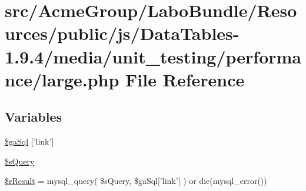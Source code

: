 \hypertarget{large_8php}{\section{src/\+Acme\+Group/\+Labo\+Bundle/\+Resources/public/js/\+Data\+Tables-\/1.9.4/media/unit\+\_\+testing/performance/large.php File Reference}
\label{large_8php}
}
\subsection*{Variables}
\begin{DoxyCompactItemize}
\item 
\hyperlink{large_8php_a57b1f46c51a5dafdbde39b16259c7e77}{\$ga\+Sql} \mbox{[}'link'\mbox{]}
\item 
\hyperlink{large_8php_a5175d5486118502db3f7aa1ccf7029cc}{\$s\+Query}
\item 
\hyperlink{large_8php_a8f423fcb1764890d70da997a4140f703}{\$r\+Result} = mysql\+\_\+query( \$s\+Query, \$ga\+Sql\mbox{[}'link'\mbox{]} ) or die(mysql\+\_\+error())
\end{DoxyCompactItemize}



